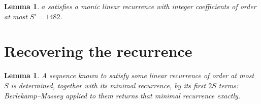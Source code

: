 \documentclass[11pt,a4paper]{article}
\theoremstyle{plain}
\newtheorem{lemma}[theorem]{Lemma}
\theoremstyle{definition}
\begin{document}
\begin{lemma}\label{lem:cf}
$a$ satisfies a monic linear recurrence with integer coefficients of order at most
$S'=1482$.
\end{lemma}

\section{Recovering the recurrence}

\begin{lemma}\label{lem:bm}
A sequence known to satisfy some linear recurrence of order at most $S$ is determined, together
with its minimal recurrence, by its first $2S$ terms: Berlekamp--Massey applied to them returns
that minimal recurrence exactly.
\end{lemma}
\end{document}

